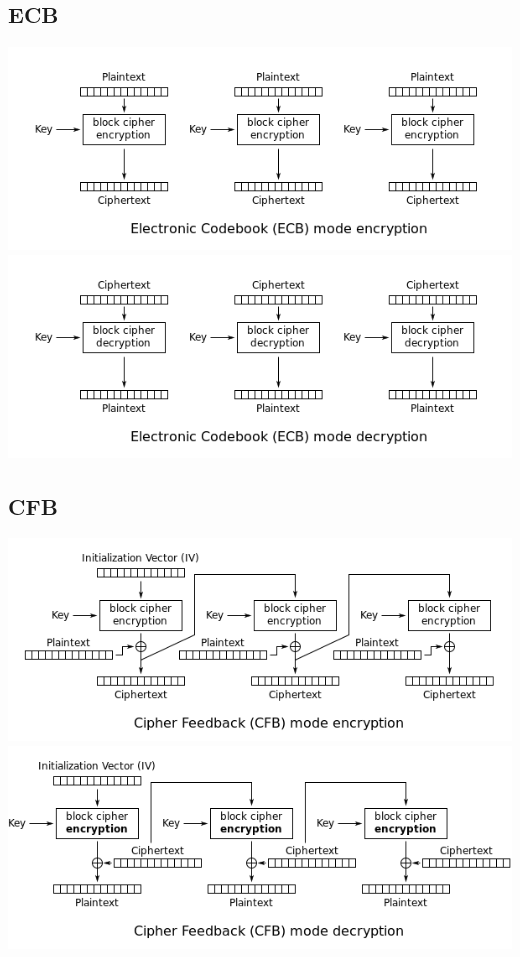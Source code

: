 \documentclass{article}
\begin{document}
\subsection{ECB}
\includegraphics[width=\textwidth,height=\textheight,keepaspectratio]{ECB_Encryption.png} \\
\includegraphics[width=\textwidth,height=\textheight,keepaspectratio]{ECB_Decryption.png} \\

\subsection{CFB}
\includegraphics[width=\textwidth,height=\textheight,keepaspectratio]{CFB_Encryption.png} \\
\includegraphics[width=\textwidth,height=\textheight,keepaspectratio]{CFB_Decryption.png} \\
\end{document}
